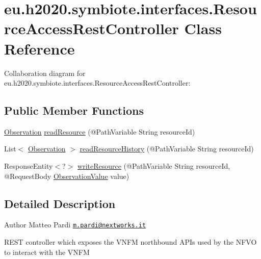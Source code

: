 \hypertarget{classeu_1_1h2020_1_1symbiote_1_1interfaces_1_1ResourceAccessRestController}{}\section{eu.\+h2020.\+symbiote.\+interfaces.\+Resource\+Access\+Rest\+Controller Class Reference}
\label{classeu_1_1h2020_1_1symbiote_1_1interfaces_1_1ResourceAccessRestController}


Collaboration diagram for eu.\+h2020.\+symbiote.\+interfaces.\+Resource\+Access\+Rest\+Controller\+:
\subsection*{Public Member Functions}
\begin{DoxyCompactItemize}
\item 
\hyperlink{classeu_1_1h2020_1_1symbiote_1_1model_1_1data_1_1Observation}{Observation} \hyperlink{classeu_1_1h2020_1_1symbiote_1_1interfaces_1_1ResourceAccessRestController_af09022a743a07f59f9fbc3d3d04d249f}{read\+Resource} (@Path\+Variable String resource\+Id)
\item 
List$<$ \hyperlink{classeu_1_1h2020_1_1symbiote_1_1model_1_1data_1_1Observation}{Observation} $>$ \hyperlink{classeu_1_1h2020_1_1symbiote_1_1interfaces_1_1ResourceAccessRestController_a64f70338dddf8ca8114af95b811efd42}{read\+Resource\+History} (@Path\+Variable String resource\+Id)
\item 
Response\+Entity$<$?$>$ \hyperlink{classeu_1_1h2020_1_1symbiote_1_1interfaces_1_1ResourceAccessRestController_a46fcbc0ec97cc5d9a62f5e12f39cd8e2}{write\+Resource} (@Path\+Variable String resource\+Id, @Request\+Body \hyperlink{classeu_1_1h2020_1_1symbiote_1_1model_1_1data_1_1ObservationValue}{Observation\+Value} value)
\end{DoxyCompactItemize}


\subsection{Detailed Description}
\begin{DoxyAuthor}{Author}
Matteo Pardi \href{mailto:m.pardi@nextworks.it}{\tt m.\+pardi@nextworks.\+it}
\end{DoxyAuthor}
R\+E\+ST controller which exposes the V\+N\+FM northbound A\+P\+Is used by the N\+F\+VO to interact with the V\+N\+FM 

